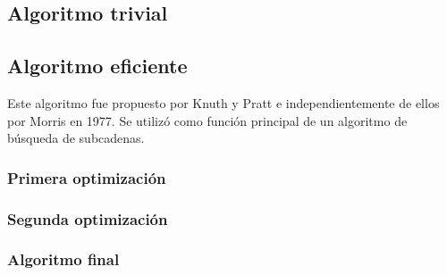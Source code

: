\subsection{Algoritmo trivial}



\subsection{Algoritmo eficiente}

Este algoritmo fue propuesto por Knuth y Pratt e independientemente de ellos por Morris en 1977. Se utilizó como función principal de un algoritmo
de búsqueda de subcadenas.

\subsubsection{Primera optimización}


\subsubsection{Segunda optimización}


\subsubsection{Algoritmo final}

